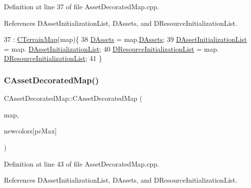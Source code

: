 Definition at line 37 of file Asset\+Decorated\+Map.\+cpp.



References D\+Asset\+Initialization\+List, D\+Assets, and D\+Resource\+Initialization\+List.


\begin{DoxyCode}
37                                                                     : 
      \hyperlink{classCTerrainMap_a2ac9c0f2622d06b8e0b1f5d67199f1ea}{CTerrainMap}(map)\{
38     \hyperlink{classCAssetDecoratedMap_a94eeed5b16141169b1ba6cb3842055aa}{DAssets} = map.\hyperlink{classCAssetDecoratedMap_a94eeed5b16141169b1ba6cb3842055aa}{DAssets};
39     \hyperlink{classCAssetDecoratedMap_a2b7bf2e9a19a9173093cef32048608c2}{DAssetInitializationList} = map.
      \hyperlink{classCAssetDecoratedMap_a2b7bf2e9a19a9173093cef32048608c2}{DAssetInitializationList};
40     \hyperlink{classCAssetDecoratedMap_ab4c78aeb90280ea98a3aa542cdb7f8cc}{DResourceInitializationList} = map.
      \hyperlink{classCAssetDecoratedMap_ab4c78aeb90280ea98a3aa542cdb7f8cc}{DResourceInitializationList};
41 \}
\end{DoxyCode}
\hypertarget{classCAssetDecoratedMap_ac22988ad1953fe43ae477dc5abc73db3}{}\label{classCAssetDecoratedMap_ac22988ad1953fe43ae477dc5abc73db3} 
\subsubsection{\texorpdfstring{C\+Asset\+Decorated\+Map()}{CAssetDecoratedMap()}\hspace{0.1cm}{\footnotesize\ttfamily [3/3]}}
{\footnotesize\ttfamily C\+Asset\+Decorated\+Map\+::\+C\+Asset\+Decorated\+Map (\begin{DoxyParamCaption}\item[{const \hyperlink{classCAssetDecoratedMap}{C\+Asset\+Decorated\+Map} \&}]{map,  }\item[{\hyperlink{GameDataTypes_8h_aafb0ca75933357ff28a6d7efbdd7602f}{E\+Player\+Color}}]{newcolors\mbox{[}pc\+Max\mbox{]} }\end{DoxyParamCaption})}



Definition at line 43 of file Asset\+Decorated\+Map.\+cpp.



References D\+Asset\+Initialization\+List, D\+Assets, and D\+Resource\+Initialization\+List.


